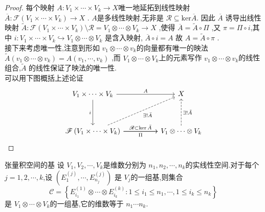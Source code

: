 \documentclass[../../几何与拓扑.tex]{subfiles}
\begin{document}
    
\begin{proof}
   每个映射 $ A:V_1\times \cdots \times V_{k} \to X $唯一地延拓到线性映射 $ \overline{A}: \mathscr{F}\left( V_1\times \cdots \times V_{k} \right)\to X  $  . $ A $是多线性映射,无非是 $ \mathscr{R} \subseteq \mathrm{ker} \overline{A} $.  因此 $ \overline{A}$
   诱导出线性映射 $ \tilde{A}: \mathscr{F}\left( V_1\times \cdots \times V_{k} \right)\setminus  \mathscr{R}= V_1\otimes \cdots \otimes V_{k}\to X  $ ,使得 $ \overline{A}= \tilde{A} \circ \Pi $ ,又 $ \pi= \Pi\circ i $,其中 $ i: V_1\times \cdots \times V_{k}\hookrightarrow  V_1\otimes \cdots \otimes V_{k} $  是含入映射, $ \overline{A}\circ i = A $ 故 $ A=  \tilde{A}\circ \pi $ .\\ 
         接下来考虑唯一性,注意到形如 $ v_1\otimes \cdots \otimes v_{k} $的向量都有唯一的映法 $ \tilde{A}\left( v_1\otimes \cdots \otimes v_{k} \right)= A\left( v_1,\cdots ,v_{k} \right)   $  ,而 $ V_1\otimes \cdots \otimes V_{k} $上的元素写作 $ v_1\otimes \cdots \otimes v_{k} $的线性组合,$ \tilde{A} $   的线性保证了映法的唯一性.\\ 
          可以用下图概括上述论证
          \[\begin{tikzcd}
	{V_1\times \cdots \times V_{k}} && X \\
	\\
	{ \mathscr{F}\left( V_1\times \cdots \times  V_{k} \right) } && {V_1 \otimes \cdots\otimes  V_{k}}
	\arrow["A", from=1-1, to=1-3]
	\arrow["i"', from=1-1, to=3-1]
	\arrow["{\exists !\bar{A}}"', dashed, from=3-1, to=1-3]
	\arrow["\Pi"', from=3-1, to=3-3]
	\arrow["{\mathscr{R}\subset \ker{\bar{A}}}", from=3-1, to=3-3]
	\arrow["{\exists! \tilde{A}}"', dashed, from=3-3, to=1-3]
\end{tikzcd}\]
\end{proof}

\begin{proposition}{张量积空间的基}\label{pro:base of abstract tensor}
    设 $ V_1,V_2,\cdots,V_k$是维数分别为 $ n_1,n_2,\cdots,n_k $的实线性空间.对于每个 $ j= 1,2,\cdots,k $,设 $ \left( E_1^{\left( j \right) }   ,\cdots , E^{\left( j \right)}_{n_{j}} \right)  $    是 $ V_{j} $的一组基,则集合 $$
    \mathscr{C}= \left\{ E_{i_1 }^{\left( 1 \right) }\otimes \cdots \otimes E_{i_{k}} ^{\left( k \right)}: 1 \le i_1\le n_1,\cdots ,1\le i_{k}\le  n_{k} \right\}
    $$ 是 $ V_1\otimes \cdots \otimes  V_{k} $的一组基,它的维数等于 $ n_1\cdots n_{k} $.  
\end{proposition}
\end{document}
